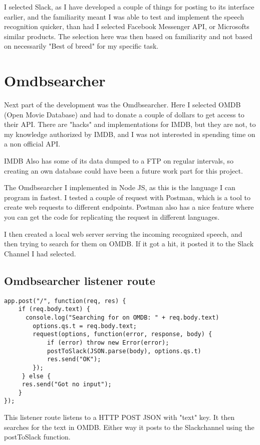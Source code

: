 \documentclass[11pt,fleqn]{book} %
\begin{document}
I selected Slack, as I have developed a couple of things for posting to its interface earlier, and the familiarity meant I was able to test and implement the speech recognition quicker, than had I selected Facebook Messenger API, or Microsofts similar products.
The selection here was then based on familiarity and not based on necessarily "Best of breed" for my specific task.

\section{Omdbsearcher}
Next part of the development was the Omdbsearcher. Here I selected OMDB (Open Movie Database)\cite{OMDbDatabase} and had to donate a couple of dollars to get access to their API. There are "hacks" and implementations for IMDB, but they are not, to my knowledge authorized by IMDB, and I was not interested in spending time on a non official API.

IMDB Also has some of its data dumped to a FTP on regular intervals, so creating an own database could have been a future work part for this project. \cite{IMDbAlternativeInterfaces}

The Omdbsearcher I implemented in Node JS, as this is the language I can program in fastest. I tested a couple of request with Postman, which is a tool to create web requests to different endpoints. Postman also has a nice feature where you can get the code for replicating the request in different languages.

I then created a local web server serving the incoming recognized speech, and then trying to search for them on OMDB. If it got a hit, it posted it to the Slack Channel I had selected.
\newpage
\subsection{Omdbsearcher listener route}
\begin{verbatim}
app.post("/", function(req, res) {
    if (req.body.text) {
      console.log("Searching for on OMDB: " + req.body.text)
        options.qs.t = req.body.text;
        request(options, function(error, response, body) {
            if (error) throw new Error(error);
            postToSlack(JSON.parse(body), options.qs.t)
            res.send("OK");
        });
     } else {
     res.send("Got no input");
    }
});
\end{verbatim}
This listener route listens to a HTTP POST JSON with "text" key. It then searches for the text in OMDB. Either way it posts to the Slackchannel using the postToSlack function.
\newpage
\end{document}
